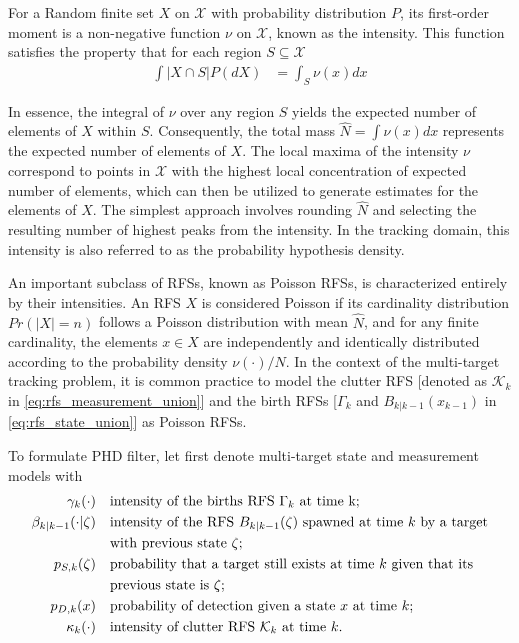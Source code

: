 For a Random finite set $X$ on $\mathcal{X}$ with probability distribution $P$, its first-order moment is a
non-negative function $\nu$ on $\mathcal{X}$, known as the intensity. This function satisfies the property that for
each region $S \subseteq \mathcal{X}$ \cite{daley2003}
\begin{align}
    \int |X \cap S | P(dX) &= \int_S \nu(x)dx
\end{align}

In essence, the integral of $\nu$ over any region $S$ yields the expected number of elements of $X$ within $S$.
Consequently, the total mass $\hat{N} = \int \nu(x)dx$ represents the expected number of elements of $X$. The local
maxima of the intensity $\nu$ correspond to points in $\mathcal{X}$ with the highest local concentration of expected
number of elements, which can then be utilized to generate estimates for the elements of $X$. The simplest approach involves rounding $\hat{N}$ and selecting the resulting number of highest peaks from the intensity. In the tracking domain, this intensity is also referred to as the probability hypothesis density.

An important subclass of RFSs, known as Poisson RFSs, is characterized entirely by their intensities. An RFS $X$ is
considered Poisson if its cardinality distribution $Pr(|X| = n)$ follows a Poisson distribution with mean $\hat{N}$,
and for any finite cardinality, the elements $x \in X$ are independently and identically distributed according to
the probability density $\nu(\cdot)/N$. In the context of the multi-target tracking problem, it is common practice
to model the clutter RFS [denoted as $\mathcal{K}_k$ in \eqref{eq:rfs_measurement_union}] and the birth RFSs [$\Gamma
_k $
and $B_{k|k-1}(x_{k-1})$ in \eqref{eq:rfs_state_union}] as Poisson RFSs.

To formulate PHD filter, let first denote multi-target state and measurement models with
\begin{align}
    \gamma_k(\cdot) \quad & \text{intensity of the births RFS $\Gamma_k$ at time k;} \\
    \beta_{k|k-1}(\cdot|\zeta) \quad & \text{intensity of the RFS $B_{k|k-1}(\zeta)$ spawned at time $k$ by a target} \notag \\
                                 \quad &  \text{with previous state $\zeta$;} \\
    p_{S,k}(\zeta) \quad & \text{probability that a target still exists at time $k$ given that its } \notag \\
                    \quad & \text{previous state is $\zeta$;} \\
    p_{D,k}(x) \quad & \text{probability of detection given a state $x$ at time $k$;} \\
    \kappa_k(\cdot) \quad & \text{intensity of clutter RFS $\mathcal{K}_k$ at time $k$}.
\end{align}

